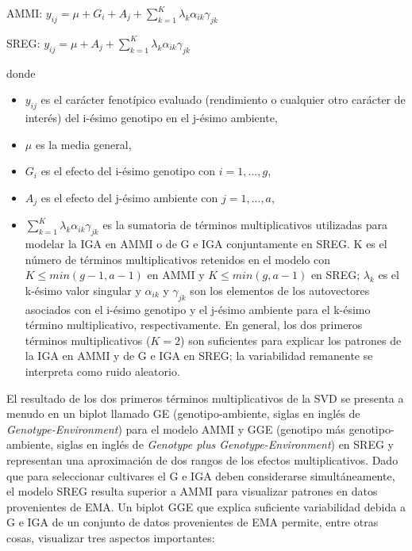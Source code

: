 \hspace{0.5cm} AMMI: $y_{ij}= \mu + G_i + A_j + \sum_{k=1}^K \lambda_k \alpha_{ik} \gamma_{jk}$

\hspace{0.5cm} SREG: $y_{ij}= \mu + A_j + \sum_{k=1}^K \lambda_k \alpha_{ik} \gamma_{jk}$ 

donde 
\begin{itemize}
\item $y_{ij}$ es el carácter fenotípico evaluado (rendimiento o cualquier otro carácter de interés) del i-ésimo genotipo en el j-ésimo ambiente,
\item $\mu$ es la media general,
\item  $G_i$ es el efecto del i-ésimo genotipo con $i=1,...,g$,
\item $A_j$ es el efecto del j-ésimo ambiente con $j=1,...,a$,
\item $\sum_{k=1}^K \lambda_k \alpha_{ik} \gamma_{jk}$ es la sumatoria de términos multiplicativos utilizadas para modelar la IGA en AMMI o de G e IGA conjuntamente en SREG. K es el número de términos multiplicativos retenidos en el modelo con $K \leq min(g-1,a-1)$ en AMMI y $K \leq min(g,a-1)$ en SREG; $\lambda_k$ es el k-ésimo valor singular y $\alpha_{ik}$ y $\gamma_{jk}$ son los elementos de los autovectores asociados con el i-ésimo genotipo y el j-ésimo ambiente para el k-ésimo término multiplicativo, respectivamente. En general, los dos primeros términos multiplicativos ($K=2$) son suficientes para explicar los patrones de la IGA en AMMI y de G e IGA en SREG; la variabilidad remanente se interpreta como ruido aleatorio. 
\end{itemize}


El resultado de los dos primeros términos multiplicativos de la SVD se presenta a menudo en un biplot llamado GE (genotipo-ambiente, siglas en inglés de \emph{Genotype-Environment}) para el modelo AMMI \citep{Zobel1988} y GGE (genotipo más genotipo-ambiente, siglas en inglés de \emph{Genotype plus Genotype-Environment}) en SREG \citep{Yanetal2000} y representan una aproximación de dos rangos de los efectos multiplicativos. Dado que para seleccionar cultivares el G e IGA deben considerarse simultáneamente, el modelo SREG resulta superior a AMMI para visualizar patrones en datos provenientes de EMA. Un biplot GGE que explica suficiente variabilidad debida a G e IGA de un conjunto de datos provenientes de EMA permite, entre otras cosas, visualizar tres aspectos importantes: 

